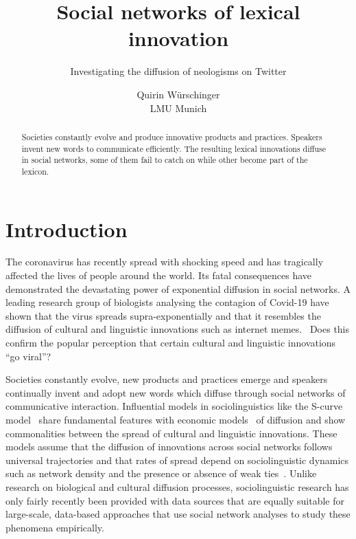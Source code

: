 \documentclass[a4paper, abstract=on]{scrartcl}
\begin{document}

  \title{Social networks of lexical innovation}
  \subtitle{Investigating the diffusion of neologisms on Twitter}
  \author{Quirin Würschinger\\ LMU Munich}
  \maketitle


\tableofcontents

  \cleardoublepage

\listoffigures

\listoftables

  \cleardoublepage


  \begin{abstract}
    Societies constantly evolve and produce innovative products and practices. Speakers invent new words to communicate efficiently. The resulting lexical innovations diffuse in social networks, some of them fail to catch on while other become part of the lexicon.
  \end{abstract}


\section{Introduction}

  The coronavirus has recently spread with shocking speed and has tragically affected the lives of people around the world. Its fatal consequences have demonstrated the devastating power of exponential diffusion in social networks. A leading research group of biologists analysing the contagion of Covid-19 have shown that the virus spreads supra-exponentially and that it resembles the diffusion of cultural and linguistic innovations such as internet memes.~\parencite{EandT2020} Does this confirm the popular perception that certain cultural and linguistic innovations \enquote{go viral}?


  Societies constantly evolve, new products and practices emerge and speakers continually invent and adopt new words which diffuse through social networks of communicative interaction. Influential models in sociolinguistics like the S-curve model~\parencite{Milroy1992} share fundamental features with economic models~\parencite{Rogers1962} of diffusion and show commonalities between the spread of cultural and linguistic innovations. These models assume that the diffusion of innovations across social networks follows universal trajectories and that rates of spread depend on sociolinguistic dynamics such as network density and the presence or absence of weak ties~\parencite{Granovetter1977}. Unlike research on biological and cultural diffusion processes, sociolinguistic research has only fairly recently been provided with data sources that are equally suitable for large-scale, data-based approaches that use social network analyses to study these phenomena empirically.
\end{document}

